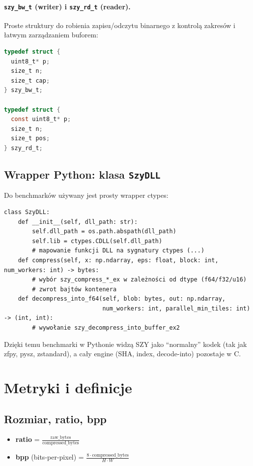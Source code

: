 \documentclass[11pt,a4paper]{article}
\begin{document}
\paragraph{\texttt{szy\_bw\_t} (writer) i \texttt{szy\_rd\_t} (reader).}
Proste struktury do robienia zapisu/odczytu binarnego z kontrolą zakresów i łatwym zarządzaniem buforem:
\begin{lstlisting}[style=cstyle,language=C]
typedef struct {
  uint8_t* p;
  size_t n;
  size_t cap;
} szy_bw_t;

typedef struct {
  const uint8_t* p;
  size_t n;
  size_t pos;
} szy_rd_t;
\end{lstlisting}

\subsection{Wrapper Python: klasa \texttt{SzyDLL}}
Do benchmarków używany jest prosty wrapper ctypes:
\begin{lstlisting}[style=txtstyle,caption={Klasa SzyDLL (Python, bench_common.py)}]
class SzyDLL:
    def __init__(self, dll_path: str):
        self.dll_path = os.path.abspath(dll_path)
        self.lib = ctypes.CDLL(self.dll_path)
        # mapowanie funkcji DLL na sygnatury ctypes (...)
    def compress(self, x: np.ndarray, eps: float, block: int, num_workers: int) -> bytes:
        # wybór szy_compress_*_ex w zależności od dtype (f64/f32/u16)
        # zwrot bajtów kontenera
    def decompress_into_f64(self, blob: bytes, out: np.ndarray,
                            num_workers: int, parallel_min_tiles: int) -> (int, int):
        # wywołanie szy_decompress_into_buffer_ex2
\end{lstlisting}
Dzięki temu benchmarki w Pythonie widzą SZY jako ``normalny'' kodek (tak jak zfpy, pysz, zstandard), a cały engine (SHA, index, decode-into) pozostaje w C.

\section{Metryki i definicje}

\subsection{Rozmiar, ratio, bpp}
\begin{itemize}
  \item \textbf{ratio} = $\frac{\text{raw\_bytes}}{\text{compressed\_bytes}}$
  \item \textbf{bpp} (bits-per-pixel) = $\frac{8\cdot \text{compressed\_bytes}}{H\cdot W}$
\end{itemize}
\end{document}
